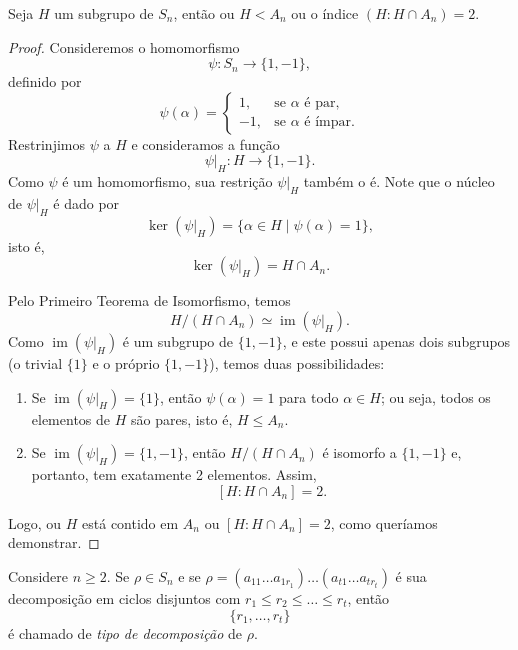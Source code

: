 \documentclass[11pt,openany]{book}
\begin{document}
\begin{proposition}
\label{prop:permutacoes_subgrupo_OU_indice2}
    Seja $H$ um subgrupo de $S_n$, então ou $H < A_n$ ou o índice $(H:H \cap A_n) = 2$.
\end{proposition}
\begin{proof}
    Consideremos o homomorfismo
    \[
    \psi: S_n \to \{1, -1\},
    \]
    definido por
    \[
    \psi(\alpha) = 
    \begin{cases}
    1, & \text{se } \alpha \text{ é par}, \\
    -1, & \text{se } \alpha \text{ é ímpar}.
    \end{cases}
    \]
    Restrinjimos \(\psi\) a \(H\) e consideramos a função
    \[
    \psi|_H : H \to \{1, -1\}.
    \]
    Como \(\psi\) é um homomorfismo, sua restrição \(\psi|_H\) também o é. Note que o núcleo de \(\psi|_H\) é dado por
    \[
    \ker (\psi|_H) = \{ \alpha \in H \mid \psi(\alpha)=1 \},
    \]
    isto é,
    \[
    \ker (\psi|_H)= H\cap A_n.
    \]
    
    Pelo Primeiro Teorema de Isomorfismo, temos
    \[
    H/(H\cap A_n) \simeq \operatorname{im} (\psi|_H).
    \]
    Como \(\operatorname{im} (\psi|_H)\) é um subgrupo de \(\{1,-1\}\), e este possui apenas dois subgrupos (o trivial \(\{1\}\) e o próprio \(\{1,-1\}\)), temos duas possibilidades:
    
    \begin{enumerate}
        \item Se \(\operatorname{im} (\psi|_H) = \{1\}\), então \(\psi(\alpha)=1\) para todo \(\alpha \in H\); ou seja, todos os elementos de \(H\) são pares, isto é, \(H \leq A_n\).
        \item Se \(\operatorname{im} (\psi|_H) = \{1, -1\}\), então \(H/(H\cap A_n)\) é isomorfo a \(\{1,-1\}\) e, portanto, tem exatamente 2 elementos. Assim,
        \[
        [H : H\cap A_n] = 2.
        \]
    \end{enumerate}
    
    Logo, ou \(H\) está contido em \(A_n\) ou \([H : H\cap A_n]=2\), como queríamos demonstrar.
    \end{proof}

\begin{definition}
\label{def:tipo_de_decomposicao}
    Considere $n \geq 2$. Se $\rho \in S_n$ e se $\rho = (a_{11} \dots a_{1r_1})\dots(a_{t1} \dots a_{tr_t})$ é sua decomposição em ciclos disjuntos com $r_1 \leq r_2 \leq \dots \leq r_t$, então 
    \[\{r_1,\dots,r_t\}\]
    é chamado de \textit{tipo de decomposição} de $\rho$.
\end{definition}
\end{document}
